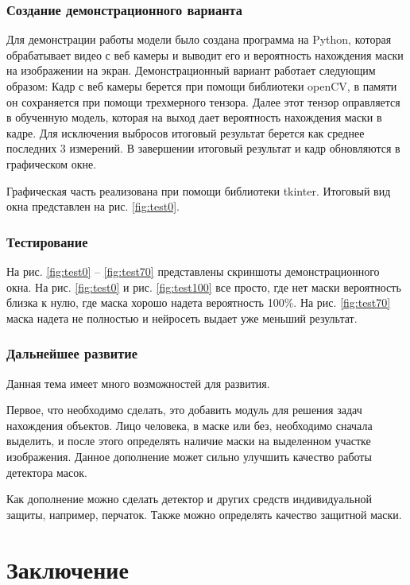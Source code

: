 \documentclass[a4paper,14pt]{article}
\begin{document}
\subsubsection{Создание демонстрационного варианта}

Для демонстрации работы модели было создана программа на Python, которая обрабатывает видео с веб камеры и выводит его и вероятность нахождения маски на изображении на экран.
Демонстрационный вариант работает следующим образом:
Кадр с веб камеры берется при помощи библиотеки openCV, в памяти он сохраняется при помощи трехмерного тензора.
Далее этот тензор оправляется в обученную модель, которая на выход дает вероятность нахождения маски в кадре.
Для исключения выбросов итоговый результат берется как среднее последних 3 измерений.
В завершении итоговый результат и кадр обновляются в графическом окне.

Графическая часть реализована при помощи библиотеки tkinter.
Итоговый вид окна представлен на рис. \ref{fig:test0}.


\subsubsection{Тестирование}

На рис. \ref{fig:test0} -- \ref{fig:test70} представлены скриншоты демонстрационного окна.
На рис. \ref{fig:test0} и рис. \ref{fig:test100} все просто, где нет маски вероятность близка к нулю, где маска хорошо надета вероятность 100\%.
На рис. \ref{fig:test70} маска надета не полностью и нейросеть выдает уже меньший результат. 

\subsubsection{Дальнейшее развитие}

Данная тема имеет много возможностей для развития.

Первое, что необходимо сделать, это добавить модуль для решения задач нахождения объектов.
Лицо человека, в маске или без, необходимо сначала выделить, и после этого определять наличие маски на выделенном участке изображения.
Данное дополнение может сильно улучшить качество работы детектора масок.

Как дополнение можно сделать детектор и других средств индивидуальной защиты, например, перчаток.
Также можно определять качество защитной маски.

\pagebreak
\section{Заключение}
\end{document}

